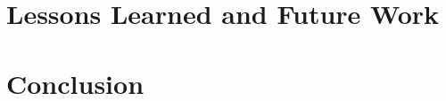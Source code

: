 \documentclass{ucbthesis}
\begin{document}
\pagestyle{headings}










\chapter{Lessons Learned and Future Work}
\label{chap:future}

\chapter{Conclusion}
\label{chap:done}


\printbibliography
\end{document}
